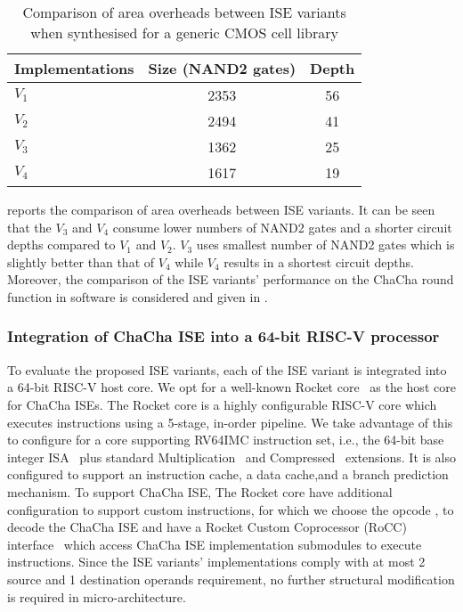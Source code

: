 \begin{table}
	\caption{Comparison of area overheads between ISE variants when synthesised for a
		generic CMOS cell library}
	\label{tab:res:hardcost1}
	\begin{tabular}{lcc}
		\toprule            
		Implementations        & Size (NAND2 gates)    & Depth  \\
		
		\midrule
		$V_1$ &     2353     & 56   \\
		$V_2$ &     2494     & 41   \\
		$V_3$ &     1362     & 25   \\
		$V_4$ &     1617     & 19   \\
		
		\bottomrule
	\end{tabular}
\end{table}

 reports the comparison of area overheads between ISE variants. It can be seen that the $V_3$ and $V_4$ consume lower numbers of NAND2 gates and a shorter circuit depths compared to $V_1$ and $V_2$. $V_3$ uses smallest number of NAND2 gates which is slightly better than that of $V_4$ while $V_4$ results in a shortest circuit depths. Moreover, the comparison of the ISE variants' performance on the ChaCha round function in software is considered and given in .

\subsubsection{Integration of ChaCha ISE into a 64-bit RISC-V processor}
\label{sec:ise:hw:sys}
To evaluate the proposed ISE variants, each of the ISE variant is integrated into a 64-bit RISC-V host core. 
We opt for a well-known Rocket core~\cite{rocket:16} as the host core for ChaCha ISEs. 
The Rocket core is a highly configurable RISC-V core which executes instructions using a 5-stage, in-order pipeline. 
We take advantage of this to configure for a core supporting RV64IMC instruction set, i.e., the 64-bit base integer ISA~\cite[Chapter 5]{RV:ISA:I} plus standard Multiplication~\cite[Chapter 7]{RV:ISA:I} and Compressed~\cite[Chapter 16]{RV:ISA:I} extensions. It is also configured to support an instruction cache, a data cache,and a branch prediction mechanism.
To support ChaCha ISE, The Rocket core have additional configuration to support custom instructions, for which we choose the  opcode \cite[Chapter 25]{RV:ISA:I}, to decode the ChaCha ISE and have a Rocket Custom Coprocessor (RoCC) interface~\cite[Section 4]{rocket:16} which access ChaCha ISE implementation submodules to execute instructions. Since the ISE variants' implementations 
comply with at most 2 source and 1 destination operands requirement, no further structural modification is required in micro-architecture. 

